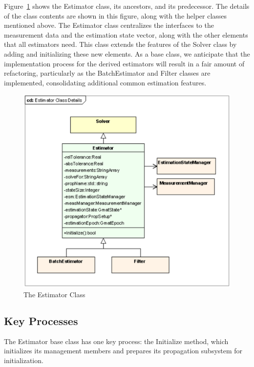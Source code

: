 Figure~\ref{fig:EstimatorClassDetails} shows the Estimator class, its ancestors, and its predecessor. The details of the class contents are shown in this figure, along with the helper classes mentioned above.  The Estimator class centralizes the interfaces to the measurement data and the estimation state vector, along with the other elements that all estimators need.  This class extends the features of the Solver class by adding and initializing these new elements.  As a base class, we anticipate that the implementation process for the derived estimators will result in a fair amount of refactoring, particularly as the BatchEstimator and Filter classes are implemented, consolidating additional common estimation features.

\begin{figure}[htbp]
\begin{center}
\includegraphics[scale=0.6]{Images/EstimatorClassDetails.eps}
\caption{\label{fig:EstimatorClassDetails}The Estimator Class}
\end{center}
\end{figure}

\subsection{Key Processes}

The Estimator base class has one key process: the Initialize method, which  initializes its management members and prepares its propagation subsystem for initialization.

